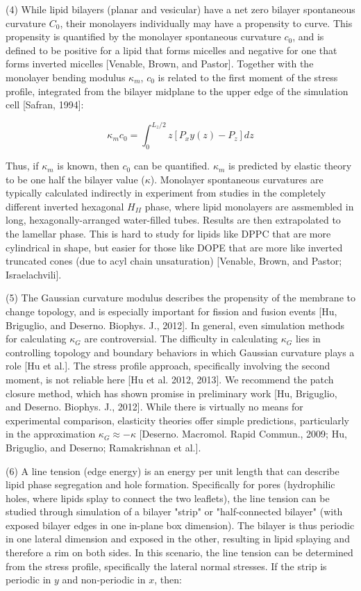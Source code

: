 \documentclass[9pt,bestpractices]{livecoms}
\begin{document}
(4) While lipid bilayers (planar and vesicular) have a net zero bilayer spontaneous curvature $C_0$, their monolayers individually may have a propensity to curve.
This propensity is quantified by the monolayer spontaneous curvature $c_0$, and is defined to be positive for a lipid that forms micelles and negative for one that forms inverted micelles [Venable, Brown, and Pastor].
Together with the monolayer bending modulus $\kappa_m$, $c_0$ is related to the first moment of the stress profile, integrated from the bilayer midplane to the upper edge of the simulation cell [Safran, 1994]:

\begin{equation}
	\label{e:partition}
	\kappa_m c_0 = \int_{0}^{L_z/2} z[P_xy(z) - P_z]dz
\end{equation}

Thus, if $\kappa_m$ is known, then $c_0$ can be quantified.
$\kappa_m$ is predicted by elastic theory to be one half the bilayer value ($\kappa$).
Monolayer spontaneous curvatures are typically calculated indirectly in experiment from studies in the completely different inverted hexagonal $H_{II}$ phase, where lipid monolayers are assmembled in long, hexagonally-arranged water-filled tubes.
Results are then extrapolated to the lamellar phase.
This is hard to study for lipids like DPPC that are more cylindrical in shape, but easier for those like DOPE that are more like inverted truncated cones (due to acyl chain unsaturation) [Venable, Brown, and Pastor; Israelachvili].

(5) The Gaussian curvature modulus describes the propensity of the membrane to change topology, and is especially important for fission and fusion events [Hu, Briguglio, and Deserno. Biophys. J., 2012].
In general, even simulation methods for calculating $\kappa_G$ are controversial.
The difficulty in calculating $\kappa_G$ lies in controlling topology and boundary behaviors in which Gaussian curvature plays a role [Hu et al.].
The stress profile approach, specifically involving the second moment, is not reliable here [Hu et al. 2012, 2013].
We recommend the patch closure method, which has shown promise in preliminary work [Hu, Briguglio, and Deserno. Biophys. J., 2012].
While there is virtually no means for experimental comparison, elasticity theories offer simple predictions, particularly in the approximation $\kappa_G \approx -\kappa$ [Deserno. Macromol. Rapid Commun., 2009; Hu, Briguglio, and Deserno; Ramakrishnan et al.].

(6) A line tension (edge energy) is an energy per unit length that can describe lipid phase segregation and hole formation.
Specifically for pores (hydrophilic holes, where lipids splay to connect the two leaflets), the line tension can be studied through simulation of a bilayer "strip" or "half-connected bilayer" (with exposed bilayer edges in one in-plane box dimension).
The bilayer is thus periodic in one lateral dimension and exposed in the other, resulting in lipid splaying and therefore a rim on both sides.
In this scenario, the line tension can be determined from the stress profile, specifically the lateral normal stresses.
If the strip is periodic in $y$ and non-periodic in $x$, then:
\end{document}
